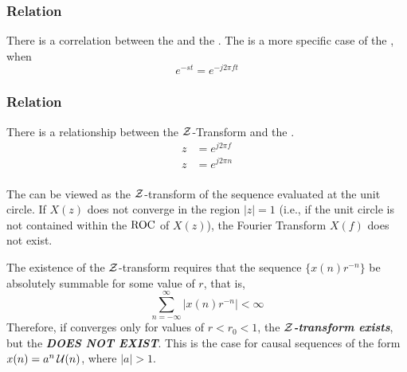\subsubsection{\texorpdfstring{  Relation}{Laplace Transform Fourier Transform Relation}}\label{subsubsec:Laplace-Transform_Fourier_Transform_Relation}
There is a correlation between the  and the .
The  is a more specific case of the , when
\begin{equation*}
  e^{-st} = e^{-j 2\pi ft}
\end{equation*}

\subsubsection{\texorpdfstring{  Relation}{Z-Transform Fourier Transform Relation}}\label{subsubsec:ZTransformFourierTransformRelation}
There is a relationship between the $\operatorname{\mathcal{Z}}$-Transform and the .
\begin{equation}\label{eq:ZTransformFourierTransformRelation}
  \begin{aligned}
    z &= e^{j 2\pi f} \\
    z &= e^{j 2\pi n} \\
  \end{aligned}
\end{equation}

The  can be viewed as the $\operatorname{\mathcal{Z}}$-transform of the sequence evaluated at the unit circle.
If $X(z)$ does not converge in the region $\lvert z \rvert = 1$ (i.e., if the unit circle is not contained within the $\operatorname{\mathrm{ROC}}$ of $X(z)$), the Fourier Transform $X(f)$ does not exist.

The existence of the $\operatorname{\mathcal{Z}}$-transform requires that the sequence $\lbrace x(n) r^{-n} \rbrace$ be absolutely summable for some value of $r$, that is,
\begin{equation}\label{eq:ZTransform_DTFT_Existence_Requirement}
  \sum\limits_{n=-\infty}^{\infty} \lvert x(n) r^{-n} \rvert < \infty
\end{equation}
Therefore, if  converges only for values of $r<r_{0}<1$, the \textbf{\emph{$\operatorname{\mathcal{Z}}$-transform exists}}, but the \textbf{\emph{ DOES NOT EXIST}}.
This is the case for causal sequences of the form $x(n) = a^{n}\operatorname{\mathcal{U}}(n)$, where $\lvert a \rvert > 1$.

